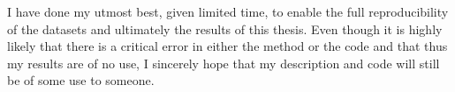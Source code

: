 I have done my utmost best, given limited time, to enable the full reproducibility of
the datasets and ultimately the results of this thesis.
Even though it is highly likely that there is a critical error in either the method
or the code and that thus my results are of no use,
I sincerely hope that my description and code will still be of some use to someone.